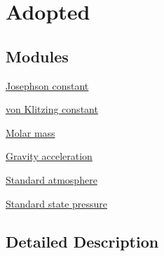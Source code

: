 \hypertarget{group___adopted}{}\section{Adopted}
\label{group___adopted}
\subsection*{Modules}
\begin{DoxyCompactItemize}
\item 
\hyperlink{group___conventional_josephson_constant}{Josephson constant}
\item 
\hyperlink{group___conventionalvon_klitzing_constant}{von Klitzing constant}
\item 
\hyperlink{group___molar_mass}{Molar mass}
\item 
\hyperlink{group___gravity_acceleration}{Gravity acceleration}
\item 
\hyperlink{group___standard_atmosphere}{Standard atmosphere}
\item 
\hyperlink{group___standard_state_pressure}{Standard state pressure}
\end{DoxyCompactItemize}


\subsection{Detailed Description}
